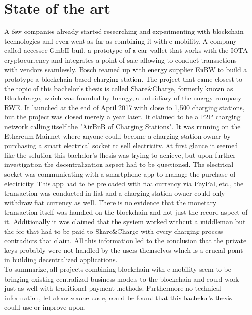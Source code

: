\section{State of the art}

A few companies already started researching and experimenting with blockchain technologies and even went as far as combining it with e-mobility. A company called accessec GmbH built a prototype of a car wallet that works with the IOTA cryptocurrency and integrates a point of sale allowing to conduct transactions with vendors seamlessly\cite{car-wallet}. Bosch teamed up with energy supplier EnBW to build a prototype a blockchain based charging station\cite{bosch-dlt}. The project that came closest to the topic of this bachelor’s thesis is called Share\&Charge\cite{share-charge}, formerly known as Blockcharge\cite{blockcharge}, which was founded by Innogy, a subsidiary of the energy company RWE\cite{innogy}. It launched at the end of April 2017 with close to 1,500 charging stations, but the project was closed merely a year later\cite{share-charge-closed}. It claimed to be a P2P charging network calling itself the "AirBnB of Charging Stations". It was running on the Ethereum Mainnet where anyone could become a charging station owner by purchasing a smart electrical socket to sell electricity. At first glance it seemed like the solution this bachelor’s thesis was trying to achieve, but upon further investigation the decentralization aspect had to be questioned. The electrical socket was communicating with a smartphone app to manage the purchase of electricity. This app had to be preloaded with fiat currency via PayPal, etc., the transaction was conducted in fiat and a charging station owner could only withdraw fiat currency as well. There is no evidence that the monetary transaction itself was handled on the blockchain and not just the record aspect of it. Additionally it was claimed that the system worked without a middleman but the fee that had to be paid to Share\&Charge with every charging process contradicts that claim. All this information led to the conclusion that the private keys probably were not handled by the users themselves which is a crucial point in building decentralized applications.
\\
To summarize, all projects combining blockchain with e-mobility seem to be bringing existing centralized business models to the blockchain and could work just as well with traditional payment methods. Furthermore no technical information, let alone source code, could be found that this bachelor’s thesis could use or improve upon.
